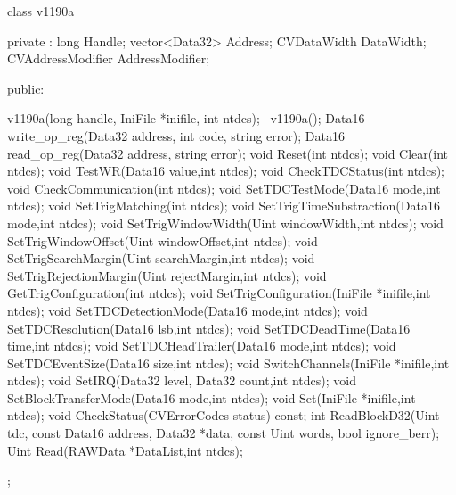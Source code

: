 	\begin{code}
    \begin{cppcode}
class v1190a
{
 private :
    long              Handle;
    vector<Data32>    Address;
    CVDataWidth       DataWidth;
    CVAddressModifier AddressModifier;

 public:

    v1190a(long handle, IniFile *inifile, int ntdcs);
    ~v1190a();
    Data16 write_op_reg(Data32 address, int code, string error);
    Data16 read_op_reg(Data32 address, string error);
    void   Reset(int ntdcs);
    void   Clear(int ntdcs);
    void   TestWR(Data16 value,int ntdcs);
    void   CheckTDCStatus(int ntdcs);
    void   CheckCommunication(int ntdcs);
    void   SetTDCTestMode(Data16 mode,int ntdcs);
    void   SetTrigMatching(int ntdcs);
    void   SetTrigTimeSubstraction(Data16 mode,int ntdcs);
    void   SetTrigWindowWidth(Uint windowWidth,int ntdcs);
    void   SetTrigWindowOffset(Uint windowOffset,int ntdcs);
    void   SetTrigSearchMargin(Uint searchMargin,int ntdcs);
    void   SetTrigRejectionMargin(Uint rejectMargin,int ntdcs);
    void   GetTrigConfiguration(int ntdcs);
    void   SetTrigConfiguration(IniFile *inifile,int ntdcs);
    void   SetTDCDetectionMode(Data16 mode,int ntdcs);
    void   SetTDCResolution(Data16 lsb,int ntdcs);
    void   SetTDCDeadTime(Data16 time,int ntdcs);
    void   SetTDCHeadTrailer(Data16 mode,int ntdcs);
    void   SetTDCEventSize(Data16 size,int ntdcs);
    void   SwitchChannels(IniFile *inifile,int ntdcs);
    void   SetIRQ(Data32 level, Data32 count,int ntdcs);
    void   SetBlockTransferMode(Data16 mode,int ntdcs);
    void   Set(IniFile *inifile,int ntdcs);
    void   CheckStatus(CVErrorCodes status) const;
    int    ReadBlockD32(Uint tdc, const Data16 address,
               Data32 *data, const Uint words, bool ignore_berr);
    Uint   Read(RAWData *DataList,int ntdcs);
};
    \end{cppcode}
	\label{cpp:v1190a}
	\vspace{5mm}
    \end{code}
    
